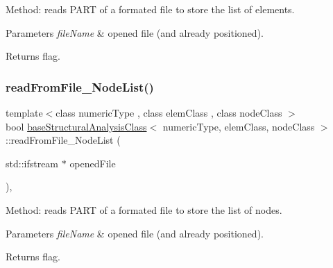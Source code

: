 Method\+: reads P\+A\+RT of a formated file to store the list of elements. 
\begin{DoxyParams}{Parameters}
{\em file\+Name} & opened file (and already positioned). \\
\hline
\end{DoxyParams}
\begin{DoxyReturn}{Returns}
flag. 
\end{DoxyReturn}
\mbox{\label{classbase_structural_analysis_class_ad81d20f7c98e21692e68db5019d0e8ae}} 
\subsubsection{\texorpdfstring{read\+From\+File\+\_\+\+Node\+List()}{readFromFile\_NodeList()}}
{\footnotesize\ttfamily template$<$class numeric\+Type , class elem\+Class , class node\+Class $>$ \\
bool \mbox{\hyperlink{classbase_structural_analysis_class}{base\+Structural\+Analysis\+Class}}$<$ numeric\+Type, elem\+Class, node\+Class $>$\+::read\+From\+File\+\_\+\+Node\+List (\begin{DoxyParamCaption}\item[{std\+::ifstream $\ast$}]{opened\+File }\end{DoxyParamCaption})\hspace{0.3cm}{\ttfamily [protected]}, {\ttfamily [virtual]}}

Method\+: reads P\+A\+RT of a formated file to store the list of nodes. 
\begin{DoxyParams}{Parameters}
{\em file\+Name} & opened file (and already positioned). \\
\hline
\end{DoxyParams}
\begin{DoxyReturn}{Returns}
flag. 
\end{DoxyReturn}
\mbox{\label{classbase_structural_analysis_class_a51b20160503d1a07359ae5e174b582c4}} 
